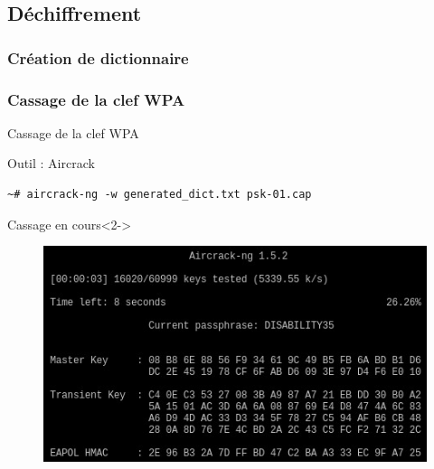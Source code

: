 \documentclass[10pt,sans,usenames,dvipsnames,french,compress]{beamer}
\begin{document}
\subsection{Déchiffrement}
\subsubsection{Création de dictionnaire}
\subsubsection{Cassage de la clef WPA}
\begin{frame}[fragile]{Cassage de la clef WPA}
	\begin{block}{Outil : Aircrack}
		\begin{lstlisting}[style=Term]
			~# aircrack-ng -w generated_dict.txt psk-01.cap
		\end{lstlisting}
	\end{block}

	\begin{block}{Cassage en cours}<2->
		\begin{figure}
			\includegraphics[width=0.7\linewidth]{118/aircrack0}
		\end{figure}
	\end{block}
\end{frame}
\end{document}
